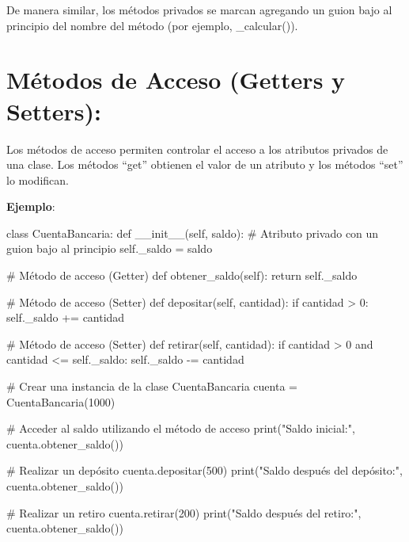 \documentclass[
  a4paper,
  DIV=11,
  numbers=noendperiod,
  onepage,
  openany]{scrreprt}
\newenvironment{Shaded}{\begin{snugshade}}{\end{snugshade}}
\newcommand{\BuiltInTok}[1]{\textcolor[rgb]{0.00,0.23,0.31}{#1}}
\newcommand{\CommentTok}[1]{\textcolor[rgb]{0.37,0.37,0.37}{#1}}
\newcommand{\ControlFlowTok}[1]{\textcolor[rgb]{0.00,0.23,0.31}{#1}}
\newcommand{\DecValTok}[1]{\textcolor[rgb]{0.68,0.00,0.00}{#1}}
\newcommand{\FunctionTok}[1]{\textcolor[rgb]{0.28,0.35,0.67}{#1}}
\newcommand{\KeywordTok}[1]{\textcolor[rgb]{0.00,0.23,0.31}{#1}}
\newcommand{\NormalTok}[1]{\textcolor[rgb]{0.00,0.23,0.31}{#1}}
\newcommand{\OperatorTok}[1]{\textcolor[rgb]{0.37,0.37,0.37}{#1}}
\newcommand{\StringTok}[1]{\textcolor[rgb]{0.13,0.47,0.30}{#1}}
\newcommand{\VariableTok}[1]{\textcolor[rgb]{0.07,0.07,0.07}{#1}}
\begin{document}
De manera similar, los métodos privados se marcan agregando un guion
bajo al principio del nombre del método (por ejemplo, \_calcular()).

\section{Métodos de Acceso (Getters y
Setters):}\label{muxe9todos-de-acceso-getters-y-setters}

Los métodos de acceso permiten controlar el acceso a los atributos
privados de una clase. Los métodos ``get'' obtienen el valor de un
atributo y los métodos ``set'' lo modifican.

\textbf{Ejemplo}:

\begin{Shaded}
\begin{Highlighting}[]
\KeywordTok{class}\NormalTok{ CuentaBancaria:}
    \KeywordTok{def} \FunctionTok{\_\_init\_\_}\NormalTok{(}\VariableTok{self}\NormalTok{, saldo):}
        \CommentTok{\# Atributo privado con un guion bajo al principio}
        \VariableTok{self}\NormalTok{.\_saldo }\OperatorTok{=}\NormalTok{ saldo}

    \CommentTok{\# Método de acceso (Getter)}
    \KeywordTok{def}\NormalTok{ obtener\_saldo(}\VariableTok{self}\NormalTok{):}
        \ControlFlowTok{return} \VariableTok{self}\NormalTok{.\_saldo}

    \CommentTok{\# Método de acceso (Setter)}
    \KeywordTok{def}\NormalTok{ depositar(}\VariableTok{self}\NormalTok{, cantidad):}
        \ControlFlowTok{if}\NormalTok{ cantidad }\OperatorTok{\textgreater{}} \DecValTok{0}\NormalTok{:}
            \VariableTok{self}\NormalTok{.\_saldo }\OperatorTok{+=}\NormalTok{ cantidad}

    \CommentTok{\# Método de acceso (Setter)}
    \KeywordTok{def}\NormalTok{ retirar(}\VariableTok{self}\NormalTok{, cantidad):}
        \ControlFlowTok{if}\NormalTok{ cantidad }\OperatorTok{\textgreater{}} \DecValTok{0} \KeywordTok{and}\NormalTok{ cantidad }\OperatorTok{\textless{}=} \VariableTok{self}\NormalTok{.\_saldo:}
            \VariableTok{self}\NormalTok{.\_saldo }\OperatorTok{{-}=}\NormalTok{ cantidad}

\CommentTok{\# Crear una instancia de la clase CuentaBancaria}
\NormalTok{cuenta }\OperatorTok{=}\NormalTok{ CuentaBancaria(}\DecValTok{1000}\NormalTok{)}

\CommentTok{\# Acceder al saldo utilizando el método de acceso}
\BuiltInTok{print}\NormalTok{(}\StringTok{"Saldo inicial:"}\NormalTok{, cuenta.obtener\_saldo())}

\CommentTok{\# Realizar un depósito}
\NormalTok{cuenta.depositar(}\DecValTok{500}\NormalTok{)}
\BuiltInTok{print}\NormalTok{(}\StringTok{"Saldo después del depósito:"}\NormalTok{, cuenta.obtener\_saldo())}

\CommentTok{\# Realizar un retiro}
\NormalTok{cuenta.retirar(}\DecValTok{200}\NormalTok{)}
\BuiltInTok{print}\NormalTok{(}\StringTok{"Saldo después del retiro:"}\NormalTok{, cuenta.obtener\_saldo())}
\end{Highlighting}
\end{Shaded}
\end{document}
